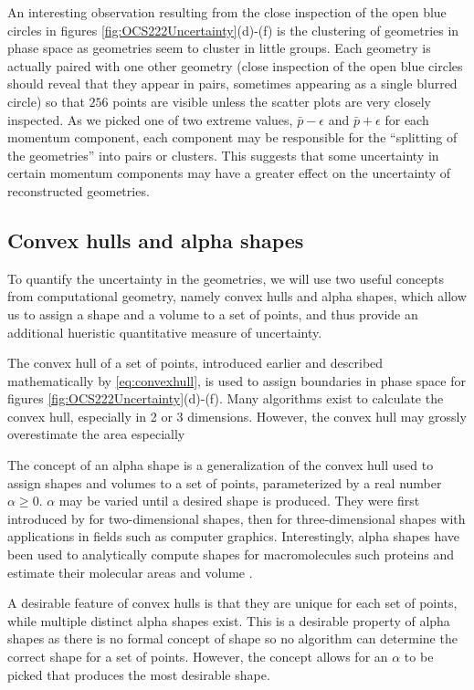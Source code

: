 An interesting observation resulting from the close inspection of the open blue circles in figures \ref{fig:OCS222Uncertainty}(d)-(f) is the clustering of geometries in phase space as geometries seem to cluster in little groups. Each geometry is actually paired with one other geometry (close inspection of the open blue circles should reveal that they appear in pairs, sometimes appearing as a single blurred circle) so that $256$ points are visible unless the scatter plots are very closely inspected. As we picked one of two extreme values, $\bar{p} - \epsilon$ and $\bar{p} + \epsilon$ for each momentum component, each component may be responsible for the ``splitting of the geometries'' into pairs or clusters. This suggests that some uncertainty in certain momentum components may have a greater effect on the uncertainty of reconstructed geometries.

\subsection{Convex hulls and alpha shapes}
To quantify the uncertainty in the geometries, we will use two useful concepts from computational geometry, namely convex hulls and alpha shapes, which allow us to assign a shape and a volume to a set of points, and thus provide an additional hueristic quantitative measure of uncertainty.

The convex hull of a set of points, introduced earlier and described mathematically by \eqref{eq:convexhull}, is used to assign boundaries in phase space for figures \ref{fig:OCS222Uncertainty}(d)-(f). Many algorithms exist to calculate the convex hull, especially in 2 or 3 dimensions. However, the convex hull may grossly overestimate the area especially 

The concept of an alpha shape is a generalization of the convex hull used to assign shapes and volumes to a set of points, parameterized by a real number $\alpha \ge 0$. $\alpha$ may be varied until a desired shape is produced. They were first introduced by \citet{Edelsbrunner83} for two-dimensional shapes, then for three-dimensional shapes \citep{Edelsbrunner94} with applications in fields such as computer graphics. Interestingly, alpha shapes have been used to analytically compute shapes for macromolecules such proteins and estimate their molecular areas and volume \citep{Liang98}. %

A desirable feature of convex hulls is that they are unique for each set of points, while multiple distinct alpha shapes exist. This is a desirable property of alpha shapes as there is no formal concept of shape so no algorithm can determine the correct shape for a set of points. However, the concept allows for an $\alpha$ to be picked that produces the most desirable shape. 

